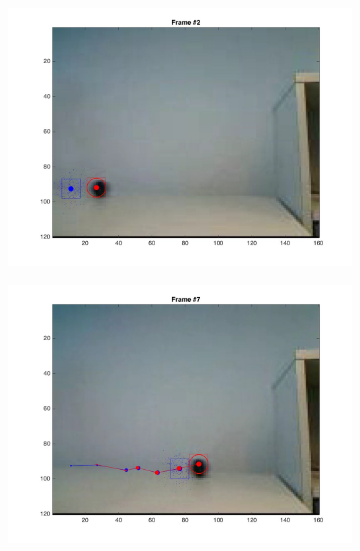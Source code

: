 \documentclass{ethz_report}
\begin{document}
\begin{figure}[h]
    \centering
    \begin{subfigure}[b]{.25\textwidth}
        \centering
        \includegraphics[width=1\linewidth]{images/video3_noise_low_1}
    \end{subfigure}%
    \begin{subfigure}[b]{.25\textwidth}
        \centering
        \includegraphics[width=1\linewidth]{images/video3_noise_low_6}
    \end{subfigure}%
    \begin{subfigure}[b]{.25\textwidth}
        \centering

\end{subfigure}
\end{figure}
\end{document}
